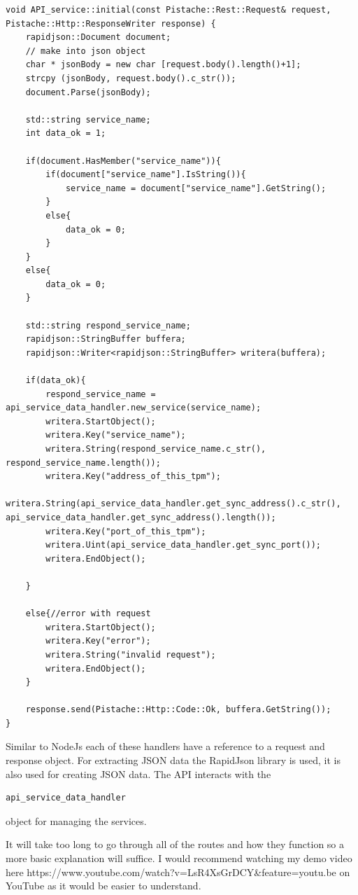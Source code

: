 \begin{lstlisting}
void API_service::initial(const Pistache::Rest::Request& request, Pistache::Http::ResponseWriter response) {
    rapidjson::Document document;
    // make into json object
    char * jsonBody = new char [request.body().length()+1];
    strcpy (jsonBody, request.body().c_str());
    document.Parse(jsonBody);
    
    std::string service_name;
    int data_ok = 1;

    if(document.HasMember("service_name")){
        if(document["service_name"].IsString()){
            service_name = document["service_name"].GetString();
        }
        else{
            data_ok = 0;
        }
    }
    else{
        data_ok = 0;
    }
    
    std::string respond_service_name;
    rapidjson::StringBuffer buffera;
    rapidjson::Writer<rapidjson::StringBuffer> writera(buffera);
    
    if(data_ok){
        respond_service_name = api_service_data_handler.new_service(service_name);
        writera.StartObject(); 
        writera.Key("service_name");                
        writera.String(respond_service_name.c_str(), respond_service_name.length());
        writera.Key("address_of_this_tpm");                
        writera.String(api_service_data_handler.get_sync_address().c_str(), api_service_data_handler.get_sync_address().length());
        writera.Key("port_of_this_tpm");
        writera.Uint(api_service_data_handler.get_sync_port());
        writera.EndObject();
        
    }
    
    else{//error with request
        writera.StartObject(); 
        writera.Key("error");                
        writera.String("invalid request");
        writera.EndObject();
    }
    
    response.send(Pistache::Http::Code::Ok, buffera.GetString());
}
\end{lstlisting}

Similar to NodeJs each of these handlers have a reference to a request and response object.
For extracting JSON data the RapidJson library is used, it is also used for creating JSON data.
The API interacts with the 
\begin{lstlisting}
api_service_data_handler
\end{lstlisting} 
object for managing the services.

It will take too long to go through all of the routes and how they function so a more basic explanation will suffice. I would recommend watching my demo video here https://www.youtube.com/watch?v=LsR4XsGrDCY&feature=youtu.be 
on YouTube as it would be easier to understand.

